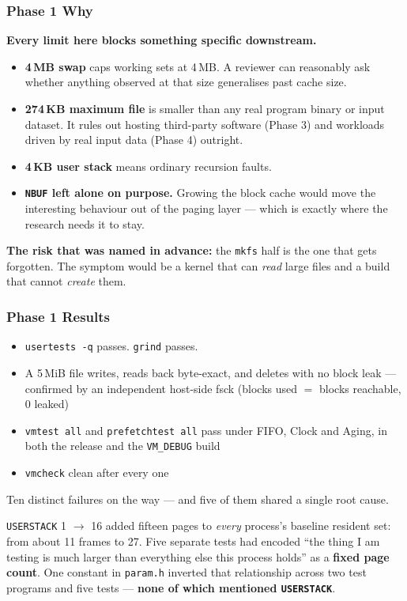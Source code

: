\documentclass[10pt,aspectratio=169]{beamer}
\newcommand{\good}[1]{\textcolor{good}{#1}}
\newcommand{\phasehead}[2]{%
  \frametitle{#1 \quad\small\normalfont\textcolor{white!75!accent}{#2}}}
\begin{document}
\begin{frame}
  \phasehead{Phase 1}{Why}
  \small
  \textbf{Every limit here blocks something specific downstream.}

  \medskip
  \begin{itemize}
    \item \textbf{4\,MB swap} caps working sets at 4\,MB. A reviewer can
          reasonably ask whether anything observed at that size generalises
          past cache size.
    \item \textbf{274\,KB maximum file} is smaller than any real program binary
          or input dataset. It rules out hosting third-party software
          (Phase 3) and workloads driven by real input data (Phase 4)
          outright.
    \item \textbf{4\,KB user stack} means ordinary recursion faults.
    \item \textbf{\texttt{NBUF} left alone on purpose.} Growing the block cache
          would move the interesting behaviour out of the paging layer ---
          which is exactly where the research needs it to stay.
  \end{itemize}

  \medskip
  \textbf{The risk that was named in advance:} the \texttt{mkfs} half is the
  one that gets forgotten. The symptom would be a kernel that can \emph{read}
  large files and a build that cannot \emph{create} them.
\end{frame}

\begin{frame}
  \phasehead{Phase 1}{Results}
  \small
  \begin{itemize}
    \item \good{\texttt{usertests -q} passes. \texttt{grind} passes.}
    \item \good{A 5\,MiB file} writes, reads back byte-exact, and deletes with
          no block leak --- confirmed by an independent host-side fsck
          (blocks used $=$ blocks reachable, 0 leaked)
    \item \good{\texttt{vmtest all} and \texttt{prefetchtest all} pass under
          FIFO, Clock and Aging}, in both the release and the \texttt{VM\_DEBUG}
          build
    \item \good{\texttt{vmcheck} clean after every one}
  \end{itemize}

  \medskip
  \alert{Ten distinct failures on the way --- and five of them shared a single
  root cause.}

  \medskip
  \texttt{USERSTACK} 1 $\to$ 16 added fifteen pages to \emph{every} process's
  baseline resident set: from about 11 frames to 27. Five separate tests had
  encoded ``the thing I am testing is much larger than everything else this
  process holds'' as a \textbf{fixed page count}. One constant in
  \texttt{param.h} inverted that relationship across two test programs and
  five tests --- \textbf{none of which mentioned \texttt{USERSTACK}}.
\end{frame}
\end{document}

